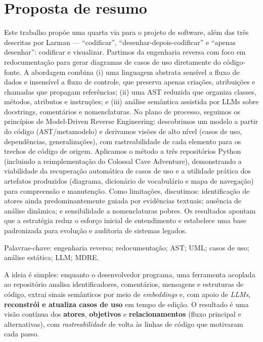 \documentclass[12pt,a4paper]{article}
\begin{document}
\section{Proposta de resumo}
Este trabalho propõe uma quarta via para o projeto de software, além das três descritas por Larman — “codificar”, “desenhar-depois-codificar” e “apenas desenhar”: codificar e visualizar. Partimos da engenharia reversa com foco em redocumentação para gerar diagramas de casos de uso diretamente do código-fonte. A abordagem combina (i) uma linguagem abstrata sensível a fluxo de dados e insensível a fluxo de controle, que preserva apenas criações, atribuições e chamadas que propagam referências; (ii) uma AST reduzida que organiza classes, métodos, atributos e instruções; e (iii) análise semântica assistida por LLMs sobre docstrings, comentários e nomenclaturas. No plano de processo, seguimos os princípios de Model-Driven Reverse Engineering: descobrimos um modelo a partir do código (AST/metamodelo) e derivamos visões de alto nível (casos de uso, dependências, generalizações), com rastreabilidade de cada elemento para os trechos de código de origem. Aplicamos o método a três repositórios Python (incluindo a reimplementação do Colossal Cave Adventure), demonstrando a viabilidade da recuperação automática de casos de uso e a utilidade prática dos artefatos produzidos (diagrama, dicionário de vocabulário e mapa de navegação) para compreensão e manutenção. Como limitações, discutimos: identificação de atores ainda predominantemente guiada por evidências textuais; ausência de análise dinâmica; e sensibilidade a nomenclaturas pobres. Os resultados apontam que a estratégia reduz o esforço inicial de entendimento e estabelece uma base padronizada para evolução e auditoria de sistemas legados.

Palavras-chave: engenharia reversa; redocumentação; AST; UML; casos de uso; análise estática; LLM; MDRE.

A ideia é simples: enquanto o desenvolvedor programa, uma ferramenta acoplada ao repositório analisa identificadores, comentários, mensagens e estruturas de código, extrai sinais semânticos por meio de \emph{embeddings} e, com apoio de \emph{LLMs}, \textbf{reconstrói e atualiza casos de uso} em tempo de edição. O resultado é uma visão contínua dos \textbf{atores}, \textbf{objetivos} e \textbf{relacionamentos} (fluxo principal e alternativas), com \emph{rastreabilidade} de volta às linhas de código que motivaram cada passo.
\end{document}
